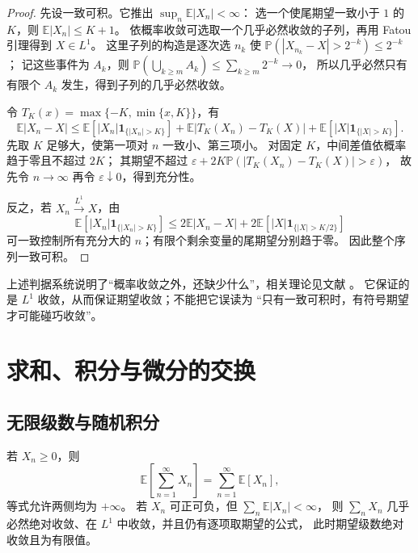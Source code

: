 \documentclass[UTF8]{ctexart}
\begin{document}
\begin{proof}
先设一致可积。它推出 $\sup_n\mathbb E|X_n|<\infty$：
选一个使尾期望一致小于 $1$ 的 $K$，则 $\mathbb E|X_n|\leq K+1$。
依概率收敛可选取一个几乎必然收敛的子列，再用 Fatou 引理得到 $X\in L^1$。
这里子列的构造是逐次选 $n_k$ 使
$\mathbb P(|X_{n_k}-X|>2^{-k})\leq2^{-k}$；
记这些事件为 $A_k$，则
$\mathbb P(\bigcup_{k\geq m}A_k)\leq\sum_{k\geq m}2^{-k}\to0$，
所以几乎必然只有有限个 $A_k$ 发生，得到子列的几乎必然收敛。

令 $T_K(x)=\max\{-K,\min\{x,K\}\}$，有
\[
  \mathbb E|X_n-X|
  \leq\mathbb E[|X_n|\mathbf1_{\{|X_n|>K\}}]
  +\mathbb E|T_K(X_n)-T_K(X)|
  +\mathbb E[|X|\mathbf1_{\{|X|>K\}}].
\]
先取 $K$ 足够大，使第一项对 $n$ 一致小、第三项小。
对固定 $K$，中间差值依概率趋于零且不超过 $2K$；
其期望不超过 $\varepsilon+2K\mathbb P(|T_K(X_n)-T_K(X)|>\varepsilon)$，
故先令 $n\to\infty$ 再令 $\varepsilon\downarrow0$，得到充分性。

反之，若 $X_n\xrightarrow{L^1}X$，由
\[
  \mathbb E[|X_n|\mathbf1_{\{|X_n|>K\}}]
  \leq2\mathbb E|X_n-X|
    +2\mathbb E[|X|\mathbf1_{\{|X|>K/2\}}]
\]
可一致控制所有充分大的 $n$；有限个剩余变量的尾期望分别趋于零。
因此整个序列一致可积。
\end{proof}

上述判据系统说明了“概率收敛之外，还缺少什么”，相关理论见文献 \cite[第 4.6 节]{durrett-pte}。
它保证的是 $L^1$ 收敛，从而保证期望收敛；不能把它误读为
“只有一致可积时，有符号期望才可能碰巧收敛”。

\section{求和、积分与微分的交换}
\label{sec:expectation-exchange}

\subsection{无限级数与随机积分}

\begin{proposition}[无限和的两种充分条件]
\label{prop:expectation-series}
若 $X_n\geq0$，则
\begin{equation}
  \mathbb E\!\left[\sum_{n=1}^\infty X_n\right]
  =\sum_{n=1}^\infty\mathbb E[X_n],
  \label{eq:expectation-positive-series}
\end{equation}
等式允许两侧均为 $+\infty$。
若 $X_n$ 可正可负，但 $\sum_n\mathbb E|X_n|<\infty$，
则 $\sum_nX_n$ 几乎必然绝对收敛、在 $L^1$ 中收敛，并且仍有逐项取期望的公式，
此时期望级数绝对收敛且为有限值。
\end{proposition}
\end{document}
